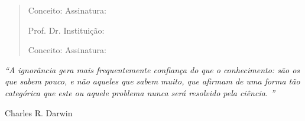 \documentclass[12pt,twoside,a4paper]{book}
\begin{document}
\begin{quote}
    \vspace{0.5cm}
    
    Conceito: \underline{\hspace{5cm}} \hspace{1cm} Assinatura: \underline{\hspace{5.2cm}}
    
    \vspace{1cm}
    
    Prof. Dr. \underline{\hspace{5cm}} \hspace{1cm} Instituição: \underline{\hspace{5cm}}
    
    \vspace{0.5cm}
    
    Conceito: \underline{\hspace{5cm}} \hspace{1cm} Assinatura: \underline{\hspace{5.2cm}}
    
    \vspace{1cm}


    \end{quote}

    \clearpage{\pagestyle{empty}\cleardoublepage}

\newpage
\thispagestyle{empty}
\begin{changemargin}{7cm}{0.5cm}
\begin{flushright}

\vspace*{10cm}

\textit{``A ignorância gera mais frequentemente confiança do que o conhecimento: são os que sabem pouco, e não aqueles que sabem muito, que afirmam de uma forma tão categórica que este ou aquele problema nunca será resolvido pela ciência.
''}

\vspace{1cm}

Charles R. Darwin

\end{flushright}
\end{changemargin}

\pagebreak




\end{document}
